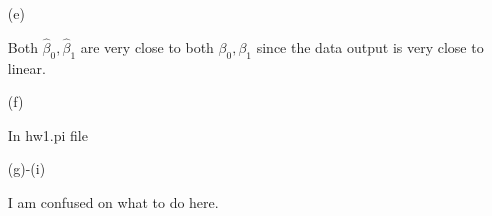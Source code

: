 \documentclass{article}
\begin{document}
\begin{enumerate}
\begin{enumerate}
        \item[(e)]
        
        Both $\hat{\beta}_0, \hat{\beta}_1$ are very close to both $\beta_0,\beta_1$ since the data output is very close to linear.
        
        \item[(f)]
        
        In hw1.pi file
        
        \item[(g)-(i)]
        
        I am confused on what to do here.
        
    \end{enumerate}
    
\end{enumerate}
\end{document}

